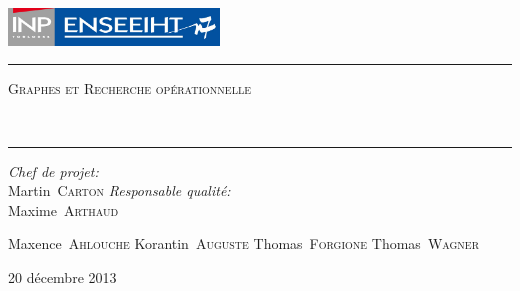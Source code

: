 \begin{titlepage}
  \begin{center}
    \includegraphics[height=1cm]{LogoEnseeiht}\\\vspace{1cm}
    \hrule\vspace{0.5cm}
    \textsc{\Large Graphes et Recherche opérationnelle}
    \\\vspace{0.5cm}

    \textbf{\huge\thetitle}
    \\\vspace{0.4cm}
    \hrule\vspace{2cm}

    \begin{minipage}{0.4\textwidth}
      \begin{flushleft} \large
        \emph{Chef de projet:}\\\hspace{1cm}Martin~\textsc{Carton}
        \emph{Responsable qualité:}\\\hspace{1cm}Maxime~\textsc{Arthaud}
      \end{flushleft}
    \end{minipage}
    \begin{minipage}{0.4\textwidth}
      \begin{flushright} \large
         Maxence~\textsc{Ahlouche}
         Korantin~\textsc{Auguste}
         Thomas~\textsc{Forgione}
         Thomas~\textsc{Wagner}
      \end{flushright}
    \end{minipage}

    \vfill
    {\large 20 décembre 2013}
  \end{center}
\end{titlepage}
